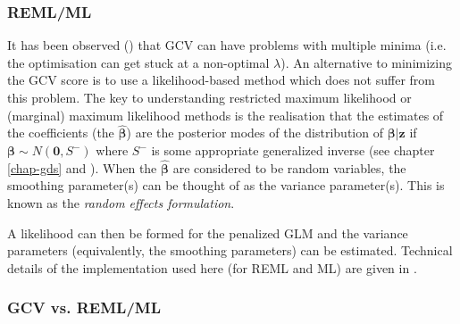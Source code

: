 %
%


\subsubsection{REML/ML}

It has been observed (\cite{reissogden}) that GCV can have problems with multiple minima (i.e. the optimisation can get stuck at a non-optimal $\lambda$). An alternative to minimizing the GCV score is to use a likelihood-based method which does not suffer from this problem. The key to understanding restricted maximum likelihood or (marginal) maximum likelihood methods is the realisation that the estimates of the coefficients (the $\bm{\hat{\beta}}$) are the posterior modes of the distribution of $\bm{\beta}|\mathbf{z}$ if $\bm{\beta} \sim N(\mathbf{0},S^-)$ where $S^-$ is some appropriate generalized inverse (see chapter \ref{chap-gds} and \cite{remlpaper}). When the $\bm{\hat{\beta}}$ are considered to be random variables, the smoothing parameter(s) can be thought of as the variance parameter(s). This is known as the \textit{random effects formulation}.

A likelihood can then be formed for the penalized GLM and the variance parameters (equivalently, the smoothing parameters) can be estimated. Technical details of the implementation used here (for REML and ML) are given in .

\subsubsection{GCV vs. REML/ML}

